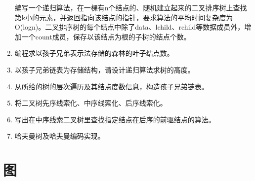 \documentclass[lang=cn,newtx,10pt,scheme=chinese]{../../elegantbook}
\begin{document}
\begin{enumerate}
  编写一个递归算法，在一棵有n个结点的、随机建立起来的二叉排序树上查找第k小的元素，并返回指向该结点的指针，要求算法的平均时间复杂度为O(logn)。二叉排序树的每个结点中除了data、lchild、rchild等数据成员外，增加一个count成员，保存以该结点为根的子树的结点个数。
\vspace{5cm}
\item
  编程求以孩子兄弟表示法存储的森林的叶子结点数。
\vspace{5cm}
\item
  以孩子兄弟链表为存储结构，请设计递归算法求树的高度。
\vspace{5cm}
\item
  从所给的树的层次遍历及其结点度数信息，构造孩子兄弟链表。
\vspace{5cm}
\item
  将二叉树先序线索化、中序线索化、后序线索化。
\vspace{5cm}
\item
  写出在中序线索二叉树里查找指定结点在后序的前驱结点的算法。
\vspace{5cm}
\item
  哈夫曼树及哈夫曼编码实现。

\end{enumerate}
\chapter{图}
\end{document}
